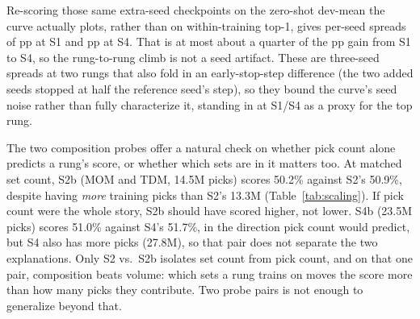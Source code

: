 Re-scoring those same extra-seed checkpoints on the zero-shot dev-mean the
curve actually plots, rather than on within-training top-1, gives
per-seed spreads of \SeedSpreadSone pp at S1 and \SeedSpreadSfour pp at
S4. That is at most about a quarter of the \SeedGainSoneSfour pp gain from
S1 to S4, so the rung-to-rung climb is not a seed artifact. These are
three-seed spreads at two rungs that also fold in an early-stop-step
difference (the two added seeds stopped at half the reference seed's
step), so they bound the curve's seed noise rather than fully characterize
it, standing in at S1/S4 as a proxy for the top rung.

The two composition probes offer a natural check on whether pick count
alone predicts a rung's score, or whether which sets are in it matters too.
At matched set count, S2b (MOM and TDM, 14.5M picks) scores 50.2\% against
S2's 50.9\%, despite having \emph{more} training picks than S2's 13.3M
(Table~\ref{tab:scaling}). If pick count were the whole story, S2b should
have scored higher, not lower. S4b (23.5M picks) scores 51.0\% against
S4's 51.7\%, in the direction pick count would predict, but S4 also has
more picks (27.8M), so that pair does not separate the two explanations.
Only S2 vs.\ S2b isolates set count from pick count, and on that one pair,
composition beats volume: which sets a rung trains on moves the score more
than how many picks they contribute. Two probe pairs is not enough to
generalize beyond that.
